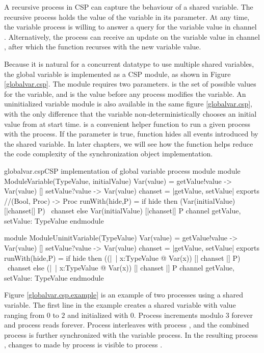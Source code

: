\documentclass{article}
\begin{document}
A recursive process in CSP can capture the behaviour of a shared variable. The recursive process holds the value of the variable in its parameter. At any time, the variable process is willing to answer a query for the variable value in channel . Alternatively, the process can receive an update on the variable value in channel , after which the function recurses with the new variable value.

Because it is natural for a concurrent datatype to use multiple shared variables, the global variable is implemented as a CSP module, as shown in Figure \ref{globalvar.csp}. The module requires two parameters.  is the set of possible values for the variable, and  is the value before any process modifies the variable. An uninitialized variable module is also available in the same figure \ref{globalvar.csp}, with the only difference that the variable non-deterministically chooses an initial value from  at start time.  is a convenient helper function to run a given process  with the  process. If the parameter  is true,  function hides all events introduced by the shared variable. In later chapters, we will see how the  function helps reduce the code complexity of the synchronization object implementation.

\begin{cspinline}{globalvar.csp}{CSP implementation of global variable process module}
module ModuleVariable(TypeValue, initialValue)
  Var(value) = getValue!value -> Var(value)
             [] setValue?value -> Var(value)
  chanset = {|getValue, setValue|}
exports
  //(Bool, Proc) -> Proc
  runWith(hide,P) = if hide then (Var(initialValue) [|chanset|] P) \ chanset
                            else  Var(initialValue) [|chanset|] P
  channel getValue, setValue: TypeValue
endmodule

module ModuleUninitVariable(TypeValue)
  Var(value) = getValue!value -> Var(value)
            [] setValue?value -> Var(value)
  chanset = {|getValue, setValue|}
exports
  runWith(hide,P) = 
    if hide then ((|~| x:TypeValue @ Var(x)) [| chanset |] P) \ chanset
    else (|~| x:TypeValue @ Var(x)) [| chanset |] P
  channel getValue, setValue: TypeValue
endmodule
\end{cspinline}

Figure \ref{globalvar.csp.example} is an example of two processes using a shared variable. The first line in the example creates a shared variable  with value ranging from $0$ to $2$ and initialized with $0$. Process  increments  modulo $3$ forever and process  reads  forever. Process  interleaves with process , and the combined process is further synchronized with the variable  process. In the resulting process , changes to  made by process  is visible to process .
\end{document}
